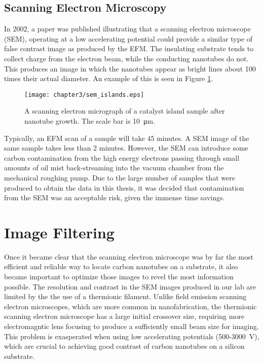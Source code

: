 \subsection{Scanning Electron Microscopy}
\label{subsec:imaging_sem}

In 2002, a paper \cite{Brintlinger2002} was published illustrating that a scanning electron microscope (SEM), operating at a low accelerating potential could provide a similar type of false contrast image as produced by the EFM. The insulating substrate tends to collect charge from the electron beam, while the conducting nanotubes do not. This produces an image in which the nanotubes appear as bright lines about 100 times their actual diameter. An example of this is seen in Figure \ref{fig:sem_islands}. 

\begin{figure}
	\centering
	\texttt{[image: chapter3/sem\_islands.eps]}
	\caption{A scanning electron micrograph of a catalyst island sample after nanotube growth. The scale bar is \SI{10}{\micro\meter}.}
	\label{fig:sem_islands}
\end{figure}

Typically, an EFM scan of a sample will take 45 minutes. A SEM image of the same sample takes less than 2 minutes. However, the SEM can introduce some carbon contamination from the high energy electrons passing through small amounts of oil mist back-streaming into the vacuum chamber from the mechanical roughing pump. Due to the large number of samples that were produced to obtain the data in this thesis, it was decided that contamination from the SEM was an acceptable risk, given the immense time savings.

\section{Image Filtering}

Once it became clear that the scanning electron microscope was by far the most efficient and reliable way to locate carbon nanotubes on a substrate, it also became important to optimize those images to revel the most information possible. The resolution and contrast in the SEM images produced in our lab are limited by the the use of a thermionic  filament. Unlike field emission scanning electron microscopes, which are more common in nanofabrication, the thermionic scanning electron microscope has a large initial crossover size, requiring more electromagntic lens focusing to produce a sufficiently small beam size for imaging. This problem is exasperated when using low accelerating potentials (500-\SI{3000}{\volt}), which are crucial to achieving good contrast of carbon nanotubes on a silicon substrate.

